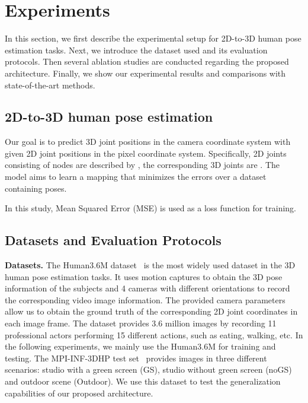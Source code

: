 \documentclass[final]{cvpr}
\begin{document}
\section{Experiments}
In this section, we first describe the experimental setup for 2D-to-3D human pose estimation tasks.
Next, we introduce the dataset used and its evaluation protocols.
Then several ablation studies are conducted regarding the proposed architecture.
Finally, we show our experimental results and comparisons with state-of-the-art methods.

\subsection{2D-to-3D human pose estimation}
Our goal is to predict 3D joint positions in the camera coordinate system with given 2D joint positions in the pixel coordinate system.
Specifically, 2D joints consisting of  nodes are described by , the corresponding 3D joints are .
The model aims to learn a mapping  that minimizes the errors over a dataset containing  poses.



In this study, Mean Squared Error (MSE) is used as a loss function  for training.

\subsection{Datasets and Evaluation Protocols}

\textbf{Datasets.} 
The Human3.6M dataset~\cite{ionescu2013human3} is the most widely used dataset in the 3D human pose estimation tasks. It uses motion captures to obtain the 3D pose information of the subjects and 4 cameras with different orientations to record the corresponding video image information. 
The provided camera parameters allow us to obtain the ground truth of the corresponding 2D joint coordinates in each image frame.
The dataset provides 3.6 million images by recording 11 professional actors performing 15 different actions, such as eating, walking, etc.
In the following experiments, we mainly use the Human3.6M for training and testing.
The MPI-INF-3DHP test set~\cite{mono-3dhp2017} provides images in three different scenarios: studio with a green screen (GS), studio without green screen (noGS) and outdoor scene (Outdoor).
We use this dataset to test the generalization capabilities of our proposed architecture.
\end{document}
